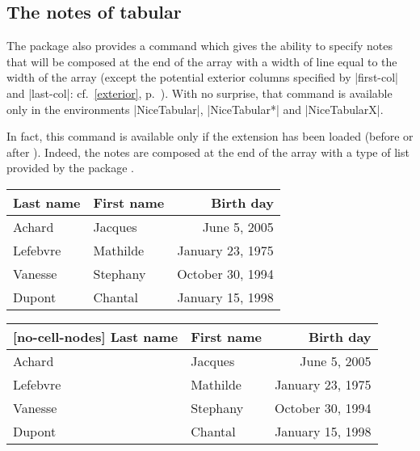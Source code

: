 \documentclass[dvipsnames]{article}%
\begin{document}
\subsection{The notes of tabular}



The package  also provides a command
 which gives the ability to specify notes that
will be composed at the end of the array with a width of line equal to the width
of the array (except the potential exterior columns specified by |first-col| and
|last-col|: cf.~\ref{exterior}, p.~\pageref{exterior}). With no surprise, that
command is available only in the environments |{NiceTabular}|, |{NiceTabular*}|
and |{NiceTabularX}|. 

In fact, this command is available only if the extension 
 has
been loaded (before or after ). Indeed, the notes are composed
at the end of the array with a type of list provided by the package
. 



\begin{Code}
\begin{NiceTabular}{@{}llr@{}}
\toprule \RowStyle{\bfseries}
Last name & First name & Birth day \\
\midrule
Achard\emph{}
& Jacques & June 5, 2005 \\
Lefebvre\emph{} 
& Mathilde & January 23, 1975 \\
Vanesse & Stephany & October 30, 1994 \\
Dupont & Chantal & January 15, 1998 \\
\bottomrule
\end{NiceTabular}
\end{Code}


\begin{center}
\begin{NiceTabular}{@{}llr@{}}[no-cell-nodes]
\toprule \RowStyle{\bfseries}
Last name & First name & Birth day \\
\midrule
Achard 
& Jacques & June 5, 2005 \\
Lefebvre 
& Mathilde & January 23, 1975 \\
Vanesse & Stephany & October 30, 1994 \\
Dupont & Chantal & January 15, 1998 \\
\bottomrule
\end{NiceTabular}
\end{center}
\end{document}

